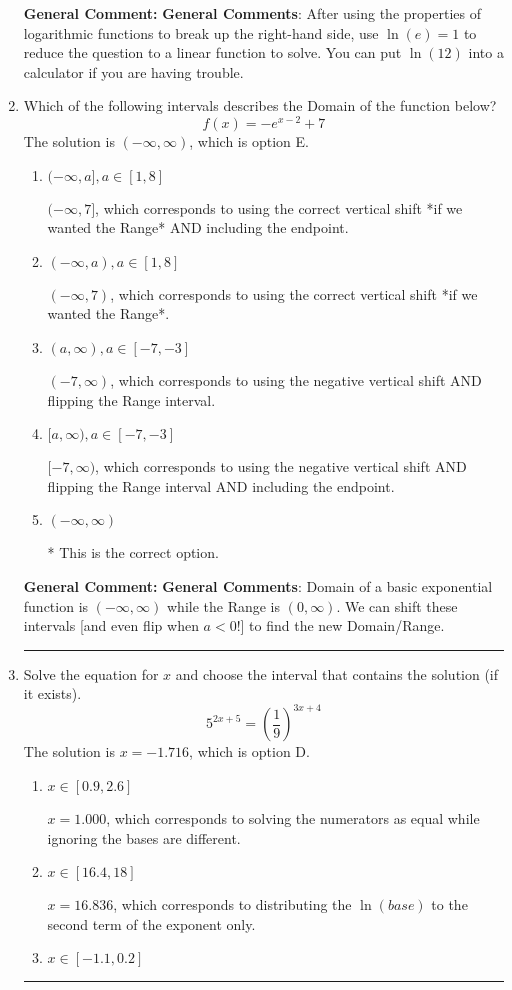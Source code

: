 \documentclass{extbook}[14pt]
\newcommand{\litem}[1]{\item #1

\rule{\textwidth}{0.4pt}}
\begin{document}
\begin{enumerate}
{\textbf{General Comment:} \textbf{General Comments}: After using the properties of logarithmic functions to break up the right-hand side, use $\ln(e) = 1$ to reduce the question to a linear function to solve. You can put $\ln(12)$ into a calculator if you are having trouble.
}
\litem{
Which of the following intervals describes the Domain of the function below?
\[ f(x) = -e^{x-2}+7 \]The solution is \( (-\infty, \infty) \), which is option E.\begin{enumerate}[label=\Alph*.]
\item \( (-\infty, a], a \in [1, 8] \)

$(-\infty, 7]$, which corresponds to using the correct vertical shift *if we wanted the Range* AND including the endpoint.
\item \( (-\infty, a), a \in [1, 8] \)

$(-\infty, 7)$, which corresponds to using the correct vertical shift *if we wanted the Range*.
\item \( (a, \infty), a \in [-7, -3] \)

$(-7, \infty)$, which corresponds to using the negative vertical shift AND flipping the Range interval.
\item \( [a, \infty), a \in [-7, -3] \)

$[-7, \infty)$, which corresponds to using the negative vertical shift AND flipping the Range interval AND including the endpoint.
\item \( (-\infty, \infty) \)

* This is the correct option.
\end{enumerate}

\textbf{General Comment:} \textbf{General Comments}: Domain of a basic exponential function is $(-\infty, \infty)$ while the Range is $(0, \infty)$. We can shift these intervals [and even flip when $a<0$!] to find the new Domain/Range.
}
\litem{
Solve the equation for $x$ and choose the interval that contains the solution (if it exists).
\[ 5^{2x+5} = \left(\frac{1}{9}\right)^{3x+4} \]The solution is \( x = -1.716 \), which is option D.\begin{enumerate}[label=\Alph*.]
\item \( x \in [0.9, 2.6] \)

$x = 1.000$, which corresponds to solving the numerators as equal while ignoring the bases are different.
\item \( x \in [16.4, 18] \)

$x = 16.836$, which corresponds to distributing the $\ln(base)$ to the second term of the exponent only.
\item \( x \in [-1.1, 0.2] \)


\end{enumerate}}
\end{enumerate}
\end{document}
